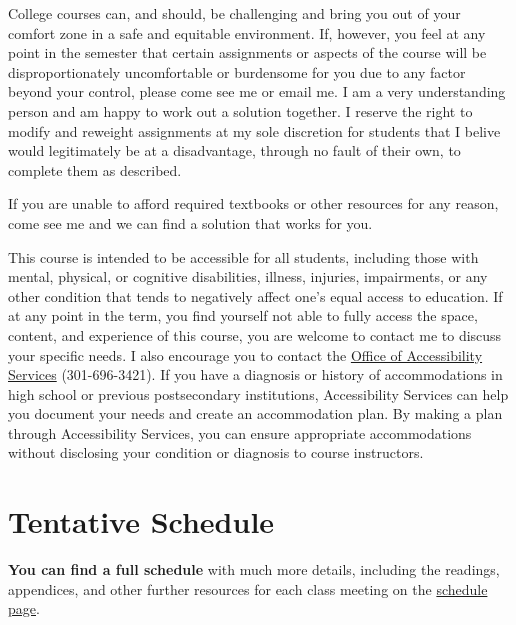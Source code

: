 \documentclass{article}
\begin{document}
College courses can, and should, be challenging and bring you out of
your comfort zone in a safe and equitable environment. If, however, you
feel at any point in the semester that certain assignments or aspects of
the course will be disproportionately uncomfortable or burdensome for
you due to any factor beyond your control, please come see me or email
me. I am a very understanding person and am happy to work out a solution
together. I reserve the right to modify and reweight assignments at my
sole discretion for students that I belive would legitimately be at a
disadvantage, through no fault of their own, to complete them as
described.

If you are unable to afford required textbooks or other resources for
any reason, come see me and we can find a solution that works for you.

This course is intended to be accessible for all students, including
those with mental, physical, or cognitive disabilities, illness,
injuries, impairments, or any other condition that tends to negatively
affect one's equal access to education. If at any point in the term, you
find yourself not able to fully access the space, content, and
experience of this course, you are welcome to contact me to discuss your
specific needs. I also encourage you to contact the
\href{https://www.hood.edu/academics/josephine-steiner-center-academic-achievement-retention/accessibility-services}{Office
of Accessibility Services} (301-696-3421). If you have a diagnosis or
history of accommodations in high school or previous postsecondary
institutions, Accessibility Services can help you document your needs
and create an accommodation plan. By making a plan through Accessibility
Services, you can ensure appropriate accommodations without disclosing
your condition or diagnosis to course instructors.

\hypertarget{tentative-schedule}{%
\section{Tentative Schedule}\label{tentative-schedule}}

\textbf{You can find a full schedule} with much more details, including
the readings, appendices, and other further resources for each class
meeting on the \href{schedule/}{schedule page}.
\end{document}
